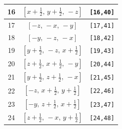 \documentclass[fleqn,8pt]{jsarticle}
\begin{document}
\begin{longtable}{ccc}
16 & $\left[ x + \frac{1}{2},\, y + \frac{1}{2},\, - z \right]$ & {\tt [16,40]} \\ \hline
17 & $\left[ - z,\, - x,\, - y \right]$ & {\tt [17,41]} \\ \hline
18 & $\left[ - y,\, - z,\, - x \right]$ & {\tt [18,42]} \\ \hline
19 & $\left[ y + \frac{1}{2},\, - z,\, x + \frac{1}{2} \right]$ & {\tt [19,43]} \\ \hline
20 & $\left[ z + \frac{1}{2},\, x + \frac{1}{2},\, - y \right]$ & {\tt [20,44]} \\ \hline
21 & $\left[ y + \frac{1}{2},\, z + \frac{1}{2},\, - x \right]$ & {\tt [21,45]} \\ \hline
22 & $\left[ - z,\, x + \frac{1}{2},\, y + \frac{1}{2} \right]$ & {\tt [22,46]} \\ \hline
23 & $\left[ - y,\, z + \frac{1}{2},\, x + \frac{1}{2} \right]$ & {\tt [23,47]} \\ \hline
24 & $\left[ z + \frac{1}{2},\, - x,\, y + \frac{1}{2} \right]$ & {\tt [24,48]} \\
\end{longtable}
\end{document}

